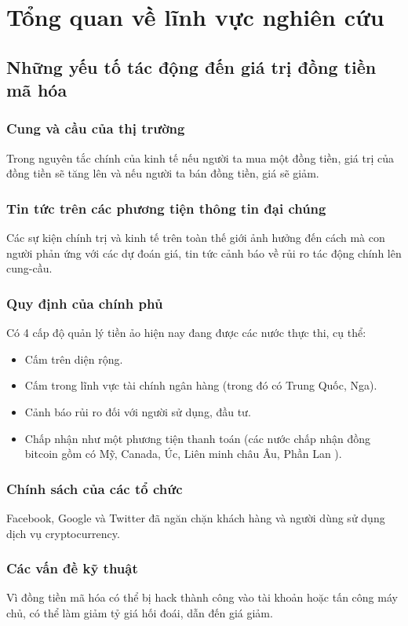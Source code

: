 \chapter{Tổng quan về lĩnh vực nghiên cứu} 
\section{Những yếu tố tác động đến giá trị đồng tiền mã hóa} \label{overview:factor}
\subsection{Cung và cầu của thị trường}
Trong nguyên tắc chính của kinh tế nếu người ta mua một đồng tiền, giá trị của đồng tiền sẽ tăng lên và nếu người ta bán đồng tiền, giá sẽ giảm.
\subsection{Tin tức trên các phương tiện thông tin đại chúng}
Các sự kiện chính trị và kinh tế trên toàn thế giới ảnh hưởng đến cách mà con người phản ứng với các dự đoán giá, tin tức cảnh báo về rủi ro tác động chính lên cung-cầu.
\subsection{Quy định của chính phủ}
Có 4 cấp độ quản lý tiền ảo hiện nay đang được các nước thực thi, cụ thể:
\begin{itemize}
\item Cấm trên diện rộng.
\item Cấm trong lĩnh vực tài chính ngân hàng (trong đó có Trung Quốc, Nga).
\item Cảnh báo rủi ro đối với người sử dụng, đầu tư.
\item  Chấp nhận như một phương tiện thanh toán (các nước chấp nhận đồng bitcoin gồm có Mỹ, Canada, Úc, Liên minh châu Âu, Phần Lan \cite{CountriesAllowBTC} ).
\end{itemize}
\subsection{Chính sách của các tổ chức}
Facebook, Google và Twitter đã ngăn chặn khách hàng và người dùng sử dụng dịch vụ cryptocurrency.
\subsection{Các vấn đề kỹ thuật}
Vì đồng tiền mã hóa có thể bị hack thành công vào tài khoản hoặc tấn công máy chủ, có thể làm giảm tỷ giá hối đoái, dẫn đến giá giảm.
